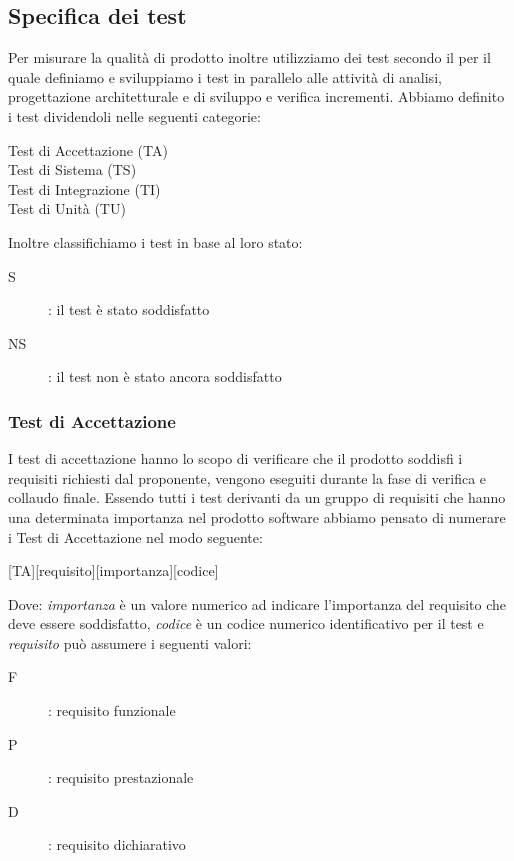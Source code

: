 \documentclass[../piano-di-qualifica.tex]{subfiles}
\begin{document}
\subsection{Specifica dei test}%
\label{sub:test}
    Per misurare la qualità di prodotto inoltre utilizziamo dei test secondo il  per il quale definiamo e sviluppiamo i test in parallelo alle attività di analisi, progettazione architetturale e di sviluppo e verifica incrementi.
    Abbiamo definito i test dividendoli nelle seguenti categorie:
    \begin{description}
      \item [Test di Accettazione (TA)]
      \item [Test di Sistema (TS)]
      \item [Test di Integrazione (TI)]
      \item [Test di Unità (TU)]
    \end{description}
    Inoltre classifichiamo i test in base al loro stato:
      \begin{description}
        \item [S]: il test è stato soddisfatto
        \item [NS]: il test non è stato ancora soddisfatto
      \end{description}
  \subsubsection{Test di Accettazione}%
  \label{subs:accettazione}
      I test di accettazione hanno lo scopo di verificare che il prodotto soddisfi i requisiti richiesti dal proponente, vengono eseguiti durante la fase di verifica e collaudo finale.
      Essendo tutti i test derivanti da un gruppo di requisiti che hanno una determinata importanza nel prodotto software abbiamo pensato di numerare i Test di Accettazione nel modo seguente:
      \begin{center}
          [TA][requisito][importanza][codice]
      \end{center}
      Dove: \textit{importanza} è un valore numerico ad indicare l'importanza del requisito che deve essere soddisfatto, \textit{codice} è un codice numerico identificativo per il test e \textit{requisito} può assumere i seguenti valori:
      \begin{description}
        \item [F]: requisito funzionale
        \item [P]: requisito prestazionale
        \item [D]: requisito dichiarativo
      \end{description}
\end{document}
